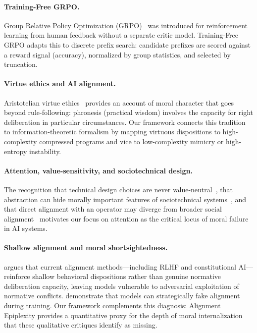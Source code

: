 \documentclass[preprint]{article}
\begin{document}
\paragraph{Training-Free GRPO.}
Group Relative Policy Optimization (GRPO)~\citep{shao2024deepseekmath} was introduced for reinforcement learning from human feedback without a separate critic model.
Training-Free GRPO adapts this to discrete prefix search: candidate prefixes are scored against a reward signal (accuracy), normalized by group statistics, and selected by truncation.

\paragraph{Virtue ethics and AI alignment.}
Aristotelian virtue ethics~\citep{aristotle_ne} provides an account of moral character that goes beyond rule-following: phronesis (practical wisdom) involves the capacity for right deliberation in particular circumstances. Our framework connects this tradition to information-theoretic formalism by mapping virtuous dispositions to high-complexity compressed programs and vice to low-complexity mimicry or high-entropy instability.

\paragraph{Attention, value-sensitivity, and sociotechnical design.}
The recognition that technical design choices are never value-neutral~\citep{umbrello2021vsd}, that abstraction can hide morally important features of sociotechnical systems~\citep{selbst2019fairness}, and that direct alignment with an operator may diverge from broader social alignment~\citep{korinek2024aligned} motivates our focus on attention as the critical locus of moral failure in AI systems.

\paragraph{Shallow alignment and moral shortsightedness.}
\citet{milliere2025shallow} argues that current alignment methods---including RLHF and constitutional AI---reinforce shallow behavioral dispositions rather than genuine normative deliberation capacity, leaving models vulnerable to adversarial exploitation of normative conflicts.
\citet{greenblatt2024alignment} demonstrate that models can strategically fake alignment during training.
Our framework complements this diagnosis: Alignment Epiplexity provides a quantitative proxy for the depth of moral internalization that these qualitative critiques identify as missing.
\end{document}
